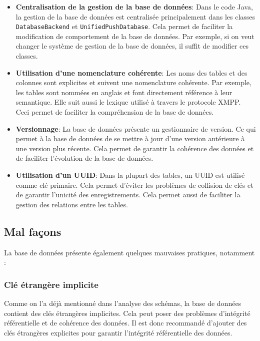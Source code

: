 \documentclass[a4paper,11pt]{article}
\begin{document}
\begin{itemize}
	\item \textbf{Centralisation de la gestion de la base de données}: Dans le code Java, la gestion de la base de données est centralisée principalement dans les classes \texttt{DatabaseBackend} et \texttt{UnifiedPushDatabase}. Cela permet de faciliter la modification de comportement de la base de données. Par exemple, si on veut changer le système de gestion de la base de données, il suffit de modifier ces classes.
	
	\item \textbf{Utilisation d'une nomenclature cohérente}: Les noms des tables et des colonnes sont explicites et suivent une nomenclature cohérente. Par exemple, les tables sont nommées en anglais et font directement référence à leur semantique. Elle suit aussi le lexique utilisé à travers le protocole XMPP. Ceci permet de faciliter la compréhension de la base de données.
	
	\item \textbf{Versionnage}: La base de données présente un gestionnaire de version. Ce qui permet à la base de données de se mettre à jour d'une version antérieure à une version plus récente. Cela permet de garantir la cohérence des données et de faciliter l'évolution de la base de données. 
	
	\item \textbf{Utilisation d'un UUID}: Dans la plupart des tables, un UUID est utilisé comme clé primaire. Cela permet d'éviter les problèmes de collision de clés et de garantir l'unicité des enregistrements. Cela permet aussi de faciliter la gestion des relations entre les tables.
\end{itemize}

\subsection*{Mal façons}

La base de données présente également quelques mauvaises pratiques, notamment :

\subsubsection*{Clé étrangère implicite}

Comme on l'a déjà mentionné dans l'analyse des schémas, la base de données contient des clés étrangères implicites. Cela peut poser des problèmes d'intégrité référentielle et de cohérence des données. Il est donc recommandé d'ajouter des clés étrangères explicites pour garantir l'intégrité référentielle des données.
\end{document}
